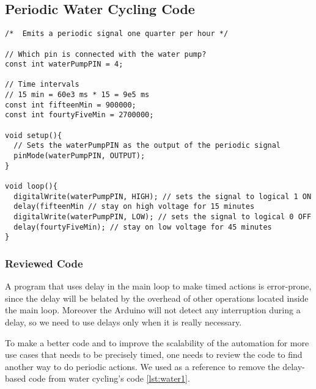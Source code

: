 \subsection{Periodic Water Cycling Code}


\begin{lstlisting}[style=Arduino, caption=Water Cycle First Code, label=lst:water1]
 /*  Emits a periodic signal one quarter per hour */

// Which pin is connected with the water pump?
const int waterPumpPIN = 4;

// Time intervals
// 15 min = 60e3 ms * 15 = 9e5 ms
const int fifteenMin = 900000;
const int fourtyFiveMin = 2700000;

void setup(){
  // Sets the waterPumpPIN as the output of the periodic signal
  pinMode(waterPumpPIN, OUTPUT);
}

void loop(){
  digitalWrite(waterPumpPIN, HIGH); // sets the signal to logical 1 ON
  delay(fifteenMin // stay on high voltage for 15 minutes
  digitalWrite(waterPumpPIN, LOW); // sets the signal to logical 0 OFF
  delay(fourtyFiveMin); // stay on low voltage for 45 minutes
}
\end{lstlisting}

\subsubsection{Reviewed Code}
A program that uses delay in the main loop to make timed actions is error-prone,
since the delay will be belated by the overhead of other operations located inside the main loop.
Moreover the Arduino will not detect any interruption during a delay,
so we need to use delays only when it is really necessary.

To make a better code and to improve the scalability of the automation for more use cases that needs to be precisely timed,
one needs to review the code to find another way to do periodic actions.
We used \cite{arduinoDelay} as a reference to remove the delay-based code from water cycling's code \ref{lst:water1}.

